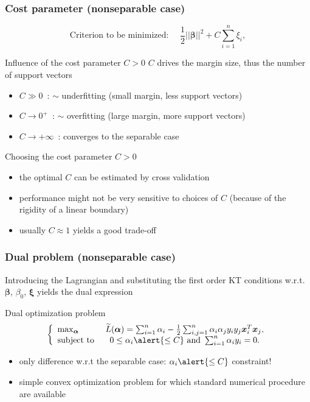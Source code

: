 \documentclass[compress, smaller, serif, 9pt]{beamer}
\newcommand{\structuretext}[1]{{\usebeamercolor[fg]{structure} #1}}
\newcommand{\doigt}{\structuretext{\noindent \Pisymbol{pzd}{43}}}
\newcommand{\bx}{{\boldsymbol{x}}}
\newcommand{\bbeta}{{\boldsymbol{\beta}}}
\newcommand{\balpha}{{\boldsymbol{\alpha}}}
\newcommand{\bxi}{{\boldsymbol{\xi}}}
\begin{document}
\begin{frame}
   \frametitle{Cost parameter (nonseparable case)}
        $$
         \textrm{Criterion to be minimized: } \quad \frac{1}{2} || \boldsymbol{\beta}||^2 + C \sum_{i=1}^n \xi_i,
      $$
   \begin{block}{Influence of the cost parameter $C>0$}
 $C$ drives the margin size, thus the number of support vectors
       \begin{itemize}
         \item $C \gg 0$~: $\sim$ underfitting (small margin, less support vectors)
         \item $C \rightarrow 0^+$~: $\sim$ overfitting (large margin, more  support vectors)
         \item $C \rightarrow +\infty$~: converges to the separable case
       \end{itemize}
    \end{block}
    
    \begin{block}{Choosing the cost parameter $C>0$}
     \begin{itemize}
         \item the optimal $C$ can be estimated by cross validation
         \item[\doigt] performance might not be very sensitive to choices of $C$ (because of the rigidity of a linear boundary)
	 \item[\doigt] usually $C\approx 1$ yields a good trade-off
       \end{itemize}  
    \end{block}


\end{frame}

\begin{frame}
   \frametitle{Dual problem (nonseparable case)}
   
   Introducing the Lagrangian and substituting the first order KT conditions w.r.t. $\bbeta$, $\beta_0$, $\bxi$
   yields the dual expression
    \begin{block}{Dual optimization problem}
   $$\left\{ \begin{array}{lc}
    \max_{\balpha}    & \widetilde{L}(\balpha)  =  \sum_{i=1}^n \alpha_i  - \frac{1}{2}   \sum_{i,j=1}^n \alpha_i \alpha_j y_i y_j 
    \bx_i^T \bx_j,\\
    \textrm{subject to } & 0 \le  \alpha_i \alert{\le C} \textrm{ and } \sum_{i=1}^n \alpha_i y_i= 0. 
   \end{array}\right. $$

\begin{itemize}
 \item[\doigt] only difference w.r.t the separable case: $\alpha_i \alert{\le C}$ constraint!
 \item[\doigt]  simple convex optimization problem for which standard numerical procedure are available
\end{itemize}
 \end{block}
 
\end{frame}
\end{document}
